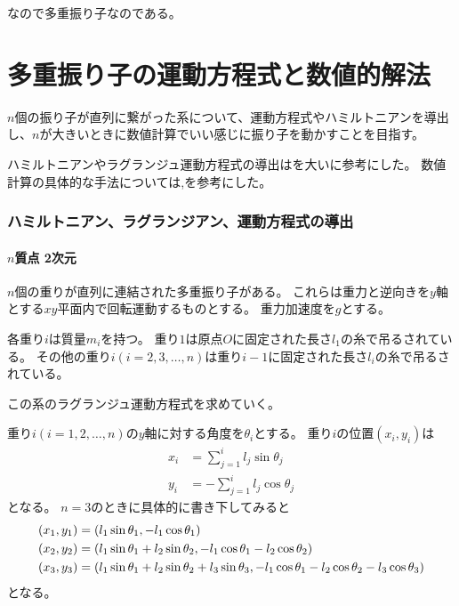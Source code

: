 \documentclass{jsarticle}
\newcommand{\eqa}[1]{\begin{align}#1\end{align}}
\begin{document}
なので多重振り子なのである。

\part{多重振り子の運動方程式と数値的解法}

$n$個の振り子が直列に繋がった系について、運動方程式やハミルトニアンを導出し、$n$が大きいときに数値計算でいい感じに振り子を動かすことを目指す。

ハミルトニアンやラグランジュ運動方程式の導出は\cite{カオス人形のしくみ}を大いに参考にした。
数値計算の具体的な手法については\cite{システム数理IV},\cite{陰的RUNGE-KUTTA法}を参考にした。

\section{ハミルトニアン、ラグランジアン、運動方程式の導出}

\subsection{$n$質点 2次元}

$n$個の重りが直列に連結された多重振り子がある。
これらは重力と逆向きを$y$軸とする$xy$平面内で回転運動するものとする。
重力加速度を$g$とする。

各重り$i$は質量$m_i$を持つ。
重り$1$は原点$O$に固定された長さ$l_1$の糸で吊るされている。
その他の重り$i(i=2,3,\dots,n)$は重り$i-1$に固定された長さ$l_i$の糸で吊るされている。

この系のラグランジュ運動方程式を求めていく。

重り$i(i=1,2,\dots,n)$の$y$軸に対する角度を$\theta_i$とする。
重り$i$の位置$(x_i, y_i)$は
\eqa{
	x_i &= \sum_{j=1}^i l_j \sin\theta_j \\
	y_i &= -\sum_{j=1}^i l_j \cos\theta_j
}
となる。
$n=3$のときに具体的に書き下してみると
\eqa{
	\left(x_1, y_1\right) &= \left(l_1 \sin\theta_1, -l_1 \cos\theta_1\right) \notag\\
	\left(x_2, y_2\right) &= \left(l_1 \sin\theta_1 + l_2 \sin\theta_2, -l_1 \cos\theta_1 - l_2 \cos\theta_2\right) \notag\\
	\left(x_3, y_3\right) &= \left(
		l_1 \sin\theta_1 + l_2 \sin\theta_2 + l_3 \sin\theta_3,
		-l_1 \cos\theta_1 - l_2 \cos\theta_2 - l_3 \cos\theta_3
		\right) \notag
}
となる。
\end{document}
